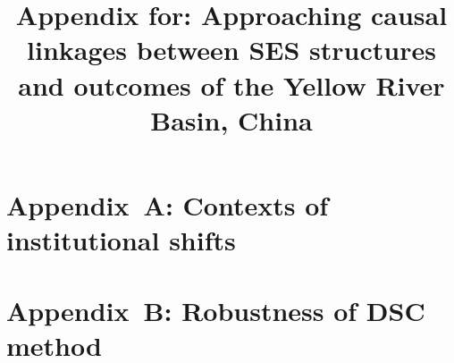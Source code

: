 \documentclass[default,sn-standardnature]{sn-jnl}
\begin{document}
\title{Appendix for: Approaching causal linkages between SES structures and outcomes of the Yellow River Basin, China}









\renewcommand{\figurename}{Supplementary Figure}
\renewcommand{\appendixname}{Appendix~\Alph{section}}
\setcounter{section}{0}

\section*{Appendix~A: Contexts of institutional shifts}\label{secS1}
\renewcommand{\thefigure}{A\arabic{figure}}
\renewcommand{\thetable}{A\arabic{table}}
\setcounter{figure}{0}
\setcounter{table}{0}


\newpage
\section*{Appendix~B: Robustness of DSC method}\label{secS2}
\renewcommand{\thefigure}{B\arabic{figure}}
\renewcommand{\thetable}{B\arabic{table}}
\setcounter{figure}{0}
\setcounter{table}{0}


% 
\end{document}
